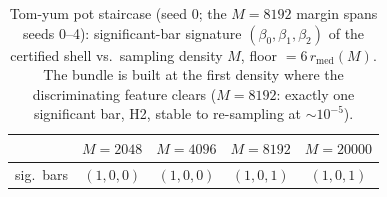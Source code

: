 \begin{table}[tb]
\centering
\caption{Tom-yum pot staircase (seed 0; the $M{=}8192$ margin spans
seeds 0--4): significant-bar signature
$(\beta_0,\beta_1,\beta_2)$ of the certified shell vs.\ sampling density
$M$, floor $=6\,r_{\mathrm{med}}(M)$. The bundle is built at the first
density where the discriminating feature clears ($M{=}8192$: exactly one
significant bar, H2, stable to re-sampling at ${\sim}10^{-5}$).}
\label{tab:potstair}
\footnotesize
\setlength{\tabcolsep}{5pt}
\begin{tabular}{lcccc}
\toprule
 & $M{=}2048$ & $M{=}4096$ & $M{=}8192$ & $M{=}20000$ \\
\midrule
sig.\ bars & $(1,0,0)$ & $(1,0,0)$ & $(1,0,1)$ & $(1,0,1)$ \\
\bottomrule
\end{tabular}
\end{table}
